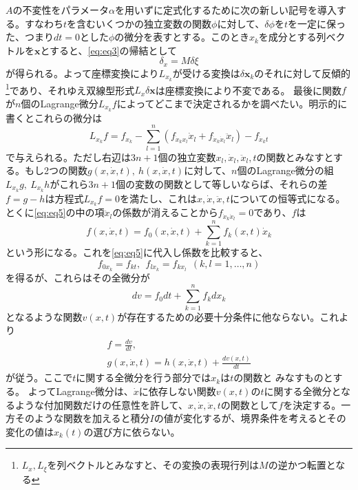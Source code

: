 \documentclass[dvipdfmx, leqno]{jsbook}
\begin{document}
    $A$の不変性をパラメータ$\alpha$を用いずに定式化するために次の新しい記号を導入する。すなわち$t$を含むいくつかの独立変数の関数$\phi$に対して、$\delta \phi$を$t$を一定に保った、つまり$dt= 0$とした$\phi$の微分を表すとする。このとき$x_k$を成分とする列ベクトルを$\bm{x}$とすると、\eqref{eq:eq3}の帰結として
\begin{equation}
    \delta_x= M\delta \xi
\end{equation}
    が得られる。よって座標変換により$L_{x_k}$が受ける変換は$\delta \bm{x}_k$のそれに対して反傾的\footnote{$L_x, L_\xi$を列ベクトルとみなすと、その変換の表現行列は$M$の逆かつ転置となる}であり、それゆえ双線型形式$L_x\delta \bm{x}$は座標変換により不変である。
    最後に関数$f$が$n$個のLagrange微分$L_{x_k}f$によってどこまで決定されるかを調べたい。明示的に書くとこれらの微分は
\begin{equation} \label{eq:eq5}
    L_{x_k}f= f_{x_k}- \sum_{l= 1}^n (f_{\dot{x}_kx_l}\dot{x}_l+ f_{\dot{x}_k\dot{x}_l}\ddot{x}_l)- f_{\dot{x}_kt}
\end{equation}
    で与えられる。ただし右辺は$3n+ 1$個の独立変数$x_l, \dot{x}_l, \ddot{x}_l, t$の関数とみなすとする。もし2つの関数$g(x, \dot{x}, t),\ h(x, \dot{x}, t)$に対して、$n$個のLagrange微分の組$L_{x_k}g,\ L_{x_k}h$がこれら$3n+ 1$個の変数の関数として等しいならば、それらの差$f= g- h$は方程式$L_{x_k}f= 0$を満たし、これは$x, \dot{x}, \ddot{x}, t$についての恒等式になる。
    とくに\eqref{eq:eq5}の中の項$\ddot{x}_l$の係数が消えることから$f_{\dot{x}_k\dot{x}_l}= 0$であり、$f$は
\begin{equation}
    f(x, \dot{x}, t)= f_0(x, \dot{x}, t)+ \sum_{k= 1}^n f_k(x, t)\dot{x}_k
\end{equation}
    という形になる。これを\eqref{eq:eq5}に代入し係数を比較すると、
\begin{equation}
    f_{0x_k}= f_{kt},\ \ f_{lx_k}= f_{kx_l}\ \ (k, l= 1, \ldots, n)
\end{equation}
    を得るが、これらはその全微分が
\begin{equation}
    dv= f_0dt+ \sum_{k= 1}^n f_kdx_k
\end{equation}
    となるような関数$v(x, t)$が存在するための必要十分条件に他ならない。これより
\begin{align}
    f= \frac{dv}{dt},\\
    g(x, \dot{x}, t)= h(x, \dot{x}, t)+ \frac{dv(x, t)}{dt}
\end{align}
    が従う。ここで$t$に関する全微分を行う部分では$x_k$は$t$の関数と
    みなすものとする。
    よってLagrange微分は、$\dot{x}$に依存しない関数$v(x, t)$の$t$に関する全微分となるような付加関数だけの任意性を許して、$x, \dot{x}, \ddot{x}, t$の関数として$f$を決定する。一方そのような関数を加えると積分$I$の値が変化するが、境界条件を考えるとその変化の値は$x_k(t)$の選び方に依らない。
\end{document}
